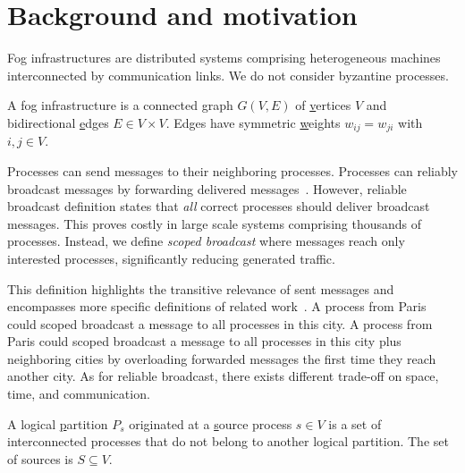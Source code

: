 
\section{Background and motivation}
\label{sec:background}

Fog infrastructures are distributed systems comprising heterogeneous
machines interconnected by communication links. We do not consider
byzantine processes.

\begin{definition}
  A fog infrastructure is a connected \underline{g}raph $G(V, E)$ of
  \underline{v}ertices $V$ and bidirectional \underline{e}dges $E \in
  V \times V$. Edges have symmetric \underline{w}eights $w_{ij} =
  w_{ji}$ with $i, j \in V$.
\end{definition}

Processes can send messages to their neighboring processes. Processes
can reliably broadcast messages by forwarding delivered
messages~\cite{nedelec2018causal,raynal2013distributed}. However,
reliable broadcast definition states that \emph{all} correct processes
should deliver broadcast messages. This proves costly in large scale
systems comprising thousands of processes. Instead, we define
\emph{scoped broadcast} where messages reach only interested
processes, significantly reducing generated traffic.

\begin{definition}
\end{definition}

This definition highlights the transitive relevance of sent messages
and encompasses more specific definitions of related
work~\cite{hsiao2005scoped,lue2006scoped,wang2015prodiluvian}.  A
process from Paris could scoped broadcast a message to all processes
in this city. A process from Paris could scoped broadcast a message to
all processes in this city plus neighboring cities by overloading
forwarded messages the first time they reach another city. As for
reliable broadcast, there exists different trade-off on space, time,
and communication.

\begin{definition}
  A logical \underline{p}artition $P_s$ originated at a
  \underline{s}ource process $s \in V$ is a set of interconnected
  processes that do not belong to another logical partition. The set
  of sources is $S \subseteq V$.
\end{definition}

